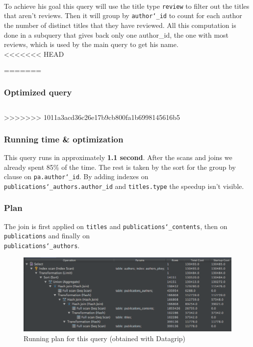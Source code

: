 \documentclass[doubleside, titlepage]{article}
\begin{document}
~\\
To achieve his goal this query will use the title type \texttt{review} to filter out the titles that aren't reviews. Then it will group by \texttt{author\char`_id} to count for each author the number of distinct titles that they have reviewed. All this computation is done in a subquery that gives back only one author_id, the one with most reviews, which is used by the main query to get his name.
~\\
<<<<<<< HEAD
		
=======

\subsubsection{Optimized query}
		\begin{lstlisting}[language=SQL,showspaces=false,basicstyle=\ttfamily,numberstyle=\tiny,commentstyle=\color{gray}]

		\end{lstlisting}

>>>>>>> 1011a3acd36c26e17b9cb800fa1b6998145616b5
\subsubsection{Running time \& optimization}

This query runs in approximately \textbf{1.1 second}. After the scans and joins we already spent 85\% of the time. The rest is taken by the sort for the group by clause on \texttt{pa.author\char`_id}. By adding indexes on \texttt{publications\char`_authors.author_id} and \texttt{titles.type} the speedup isn't visible.


\subsubsection{Plan}
The join is first applied on \texttt{titles} and \texttt{publications\char`_contents}, then on \texttt{publications} and finally on ~\\ \texttt{publications\char`_authors}.

\begin{figure}[!htb]
	\centering
    \includegraphics[scale = 0.5]{./query_analysis/query21}
    \caption{Running plan for this query (obtained with Datagrip)}
\end{figure}
\end{document}
